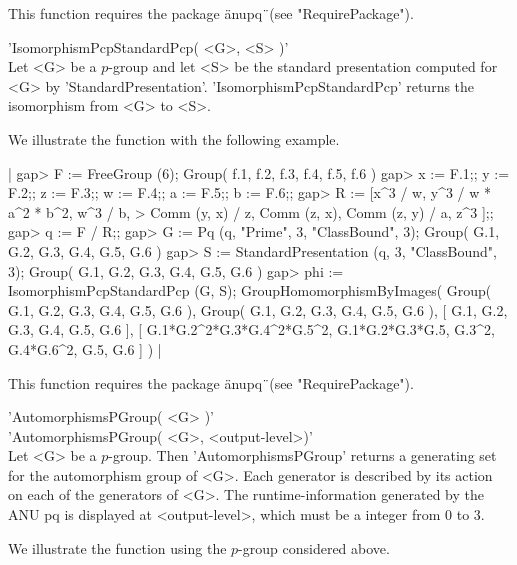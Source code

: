 This function requires the package \"anupq\"\ (see "RequirePackage").


'IsomorphismPcpStandardPcp( <G>, <S>  )' \\

Let  <G> be  a  $p$-group and  let <S>  be  the  standard presentation
computed for <G> by 'StandardPresentation'. 'IsomorphismPcpStandardPcp'
returns the isomorphism from <G> to <S>.

We illustrate the function with the following example.

|    gap> F := FreeGroup (6);
    Group( f.1, f.2, f.3, f.4, f.5, f.6 )
    gap> x := F.1;; y := F.2;; z := F.3;; w := F.4;; a := F.5;; b := F.6;;
    gap> R := [x^3 / w, y^3 / w * a^2 * b^2, w^3 / b,
    >             Comm (y, x) / z, Comm (z, x), Comm (z, y) / a, z^3 ];;
    gap> q := F / R;;
    gap> G := Pq (q, "Prime", 3, "ClassBound", 3);
    Group( G.1, G.2, G.3, G.4, G.5, G.6 )
    gap> S := StandardPresentation (q, 3, "ClassBound", 3);
    Group( G.1, G.2, G.3, G.4, G.5, G.6 )
    gap> phi := IsomorphismPcpStandardPcp (G, S);
    GroupHomomorphismByImages( Group( G.1, G.2, G.3, G.4, G.5,
    G.6 ), Group( G.1, G.2, G.3, G.4, G.5, G.6 ),
    [ G.1, G.2, G.3, G.4, G.5, G.6 ],
    [ G.1*G.2^2*G.3*G.4^2*G.5^2, G.1*G.2*G.3*G.5, G.3^2, G.4*G.6^2, G.5,
      G.6 ] ) |

This function requires the package \"anupq\"\ (see "RequirePackage").


'AutomorphismsPGroup( <G> )' \\
'AutomorphismsPGroup( <G>, <output-level>)' \\

Let  <G>  be  a  $p$-group.   Then  'AutomorphismsPGroup'   returns  a
generating  set  for  the automorphism  group of <G>.  Each  generator
is    described   by its  action  on  each  of  the generators of <G>.
The runtime-information  generated  by  the ANU pq is displayed at
<output-level>, which must be a integer from 0 to 3.

We illustrate the function using the $p$-group considered above.

